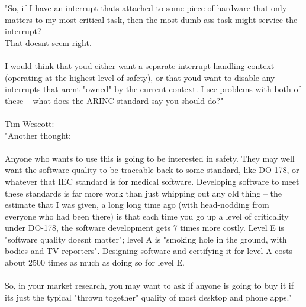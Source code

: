 "So, if I have an interrupt that\textquotesingle s attached to some piece of hardware that only matters to my most 
critical task, then the most dumb-ass task might service the interrupt?\\
That doesn\textquotesingle t seem right.\\
\\

I would think that you\textquotesingle d either want a separate interrupt-handling context (operating at the highest level 
of safety), or that you\textquotesingle d want to disable any interrupts that aren\textquotesingle t "owned" by the current context.  I 
see problems with both of these -- what does the ARINC standard say you should do?"\\
\\
Tim Wescott:\\
"Another thought:\\
\\

Anyone who wants to use this is going to be interested in safety.  They may well want the software quality 
to be traceable back to some standard, like DO-178, or whatever that IEC standard is for medical software.  
Developing software to meet these standards is far more work than just whipping out any old thing -- the 
estimate that I was given, a long long time ago (with head-nodding from everyone who had been there) is 
that each time you go up a level of criticality under DO-178, the software development gets 7 times more 
costly.  Level E is "software quality doesn\textquotesingle t matter"; level A is "smoking hole in the ground, with bodies 
and TV reporters".  Designing software and certifying it for level A costs about 2500 times as much as 
doing so for level E.\\
\\

So, in your market research, you may want to ask if anyone is going to buy it if it\textquotesingle s just the typical "thrown together" quality of most desktop and phone apps."\\

